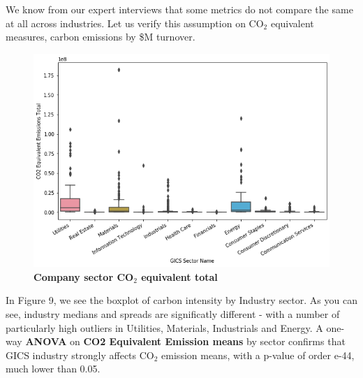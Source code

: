 \documentclass[12pt]{report}
\begin{document}
We know from our expert interviews that some metrics do not compare the same at all across industries. Let us verify this assumption on CO$_{2}$ equivalent measures, carbon emissions by \$M turnover. 
\begin{figure}[ht]
\centering
\includegraphics[scale=0.5]{CO2_equivalent_total_sector.png}
\caption{\textbf{Company sector CO$_{2}$ equivalent total}}
\label{fig:co2equivalent}
\end{figure}
In Figure 9, we see the boxplot of carbon intensity by Industry sector. As you can see, industry medians and spreads are significatly different - with a number of particularly high outliers in Utilities, Materials, Industrials and Energy. A one-way \textbf{ANOVA} on \textbf{CO2 Equivalent Emission means} by sector confirms that GICS industry strongly affects CO$_{2}$ emission means, with a p-value of order e-44, much lower than 0.05.  
\end{document}
